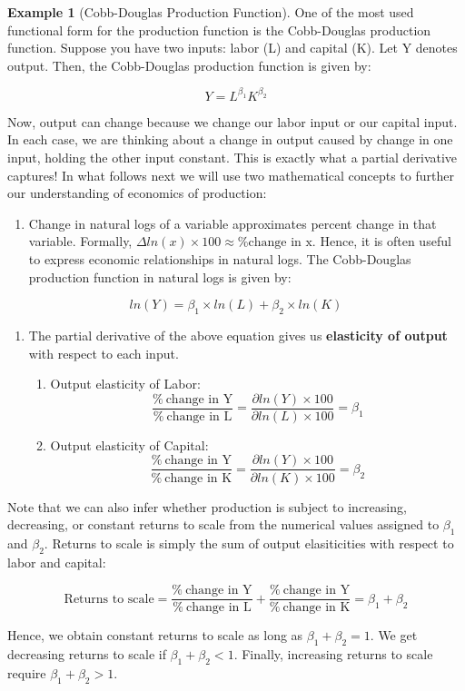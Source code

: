 \documentclass[
]{book}
\providecommand{\tightlist}{%
  \setlength{\itemsep}{0pt}\setlength{\parskip}{0pt}}
\theoremstyle{definition}
\theoremstyle{definition}
\newtheorem{example}{Example}[chapter]
\theoremstyle{definition}
\theoremstyle{definition}
\theoremstyle{remark}
\begin{document}
\begin{example}[Cobb-Douglas Production Function]
\protect\hypertarget{exm:unnamed-chunk-9}{}\label{exm:unnamed-chunk-9}One of the most used functional form for the production function is the Cobb-Douglas production function. Suppose you have two inputs: labor (L) and capital (K). Let Y denotes output. Then, the Cobb-Douglas production function is given by:

\[Y=L^{\beta_1}K^{\beta_2}\]

Now, output can change because we change our labor input or our capital input. In each case, we are thinking about a change in output caused by change in one input, holding the other input constant. This is exactly what a partial derivative captures! In what follows next we will use two mathematical concepts to further our understanding of economics of production:

\begin{enumerate}
\def\labelenumi{\arabic{enumi}.}
\tightlist
\item
  Change in natural logs of a variable approximates percent change in that variable. Formally, \(\Delta ln(x) \times 100 \approx \text{\% change in x}\). Hence, it is often useful to express economic relationships in natural logs. The Cobb-Douglas production function in natural logs is given by:
\end{enumerate}

\[ln(Y)=\beta_1 \times ln(L) + \beta_2 \times ln(K) \]

\begin{enumerate}
\def\labelenumi{\arabic{enumi}.}
\setcounter{enumi}{1}
\item
  The partial derivative of the above equation gives us \textbf{elasticity of output} with respect to each input.

  \begin{enumerate}
  \def\labelenumii{\alph{enumii}.}
  \item
    Output elasticity of Labor:
    \[\frac{\% \ \text{change in Y}}{\% \ \text{change in L}} = \frac{\partial ln(Y) \times 100}{ \partial ln(L) \times 100}=\beta_1\]
  \item
    Output elasticity of Capital:
    \[\frac{\% \ \text{change in Y}}{\% \ \text{change in K}} = \frac{\partial ln(Y) \times 100}{ \partial ln(K) \times 100}=\beta_2\]
  \end{enumerate}
\end{enumerate}

Note that we can also infer whether production is subject to increasing, decreasing, or constant returns to scale from the numerical values assigned to \(\beta_1\) and \(\beta_2\). Returns to scale is simply the sum of output elasiticities with respect to labor and capital:

\[\text{Returns to scale}= \frac{\% \ \text{change in Y}}{\% \  \text{change in L}}+\frac{\% \ \text{change in Y}}{\% \ \text{change in K}}=\beta_1+\beta_2\]

Hence, we obtain constant returns to scale as long as \(\beta_1+\beta_2=1\). We get decreasing returns to scale if \(\beta_1+\beta_2<1\). Finally, increasing returns to scale require \(\beta_1+\beta_2>1\).
\end{example}
\end{document}
